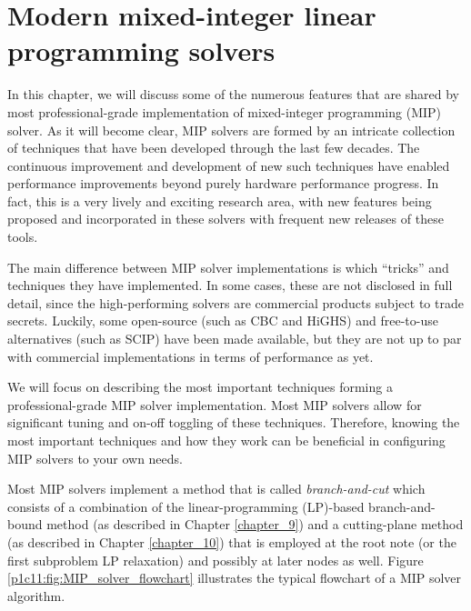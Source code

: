\section{Modern mixed-integer linear programming solvers}

In this chapter, we will discuss some of the numerous features that are shared by most professional-grade implementation of mixed-integer programming (MIP) solver. As it will become clear, MIP solvers are formed by an intricate collection of techniques that have been developed through the last few decades. The continuous improvement and development of new such techniques have enabled performance improvements beyond purely hardware performance progress. In fact, this is a very lively and exciting research area, with new features being proposed and incorporated in these solvers with frequent new releases of these tools.

The main difference between MIP solver implementations is which ``tricks'' and techniques they have implemented. In some cases, these are not disclosed in full detail, since the high-performing solvers are commercial products subject to trade secrets. Luckily, some open-source (such as CBC and HiGHS) and free-to-use alternatives (such as SCIP) have been made available, but they are not up to par with commercial implementations in terms of performance as yet.

We will focus on describing the most important techniques forming a professional-grade MIP solver implementation. Most MIP solvers allow for significant tuning and on-off toggling of these techniques. Therefore, knowing the most important techniques and how they work can be beneficial in configuring MIP solvers to your own needs.

Most MIP solvers implement a method that is called \emph{branch-and-cut} which consists of a combination of the linear-programming (LP)-based branch-and-bound method (as described in Chapter \ref{chapter_9}) and a cutting-plane method (as described in Chapter \ref{chapter_10}) that is employed at the root note (or the first subproblem LP relaxation) and possibly at later nodes as well. Figure \ref{p1c11:fig:MIP_solver_flowchart} illustrates the typical flowchart of a MIP solver algorithm.

